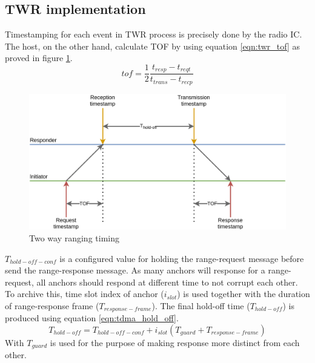 \documentclass[\main/main.tex]{subfiles}
\begin{document}
\subsection{TWR implementation}
Timestamping for each event in TWR process is precisely done by the radio IC. The host, on the other hand, calculate TOF by using equation \ref{eqn:twr_tof} as proved in figure \ref{fig:twr_timing}.
\begin{equation}
    tof = \frac{1}{2} \frac{t_{resp} - t_{reqt}}{t_{trans} - t_{recp}}
    \label{eqn:twr_tof}
\end{equation}
\begin{figure}[H]
    \begin{center}
        \includegraphics[scale=0.3]{twr_timing.png}
    \end{center}
    \caption{Two way ranging timing}
    \label{fig:twr_timing}
\end{figure}

$T_{hold-off-conf}$ is a configured value for holding the range-request message before send the range-response message.
As many anchors will response for a range-request, all anchors should respond at different time to not corrupt each other. To archive this, time slot index of anchor ($i_{slot}$) is used together with the duration of range-response frame ($T_{response-frame}$). The final hold-off time ($T_{hold-off}$) is produced using equation \ref{eqn:tdma_hold_off}.
\begin{equation}
   T_{hold-off} = T_{hold-off-conf} + i_{slot}(T_{guard} + T_{response-frame})
   \label{eqn:tdma_hold_off}
\end{equation}
With $T_{guard}$ is used for the purpose of making response more distinct from each other.

\end{document}
